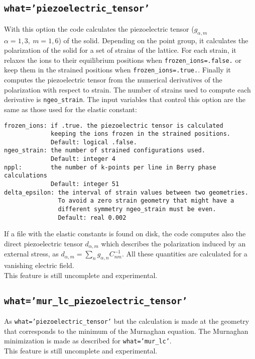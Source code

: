 \documentclass[12pt,a4paper]{article}
\begin{document}
\subsection{\texttt{what='piezoelectric\_tensor'}}
With this option the code calculates the piezoelectric tensor 
($g_{\alpha,m}$ $\alpha=1,3,\ m=1,6$) of the solid.
Depending on the point group, it calculates the polarization of the
solid for a set of strains of the lattice. For each strain, it relaxes 
the ions to their equilibrium positions when \texttt{frozen\_ions=.false.} 
or keep them in the strained positions when \texttt{frozen\_ions=.true.}. 
Finally it computes the piezoelectric tensor from the numerical derivatives 
of the polarization with respect to strain.
The number of strains used to compute each derivative is \texttt{ngeo\_strain}. The input variables
that control this option are the same as those used for the elastic constant:
\begin{verbatim}
frozen_ions: if .true. the piezoelectric tensor is calculated 
             keeping the ions frozen in the strained positions. 
             Default: logical .false.
ngeo_strain: the number of strained configurations used. 
             Default: integer 4
nppl:        the number of k-points per line in Berry phase calculations
             Default: integer 51
delta_epsilon: the interval of strain values between two geometries.
               To avoid a zero strain geometry that might have a
               different symmetry ngeo_strain must be even.
               Default: real 0.002
\end{verbatim}
If a file with the elastic constants is found on disk, the code computes also
the direct piezoelectric tensor $d_{\alpha,m}$ which describes
the polarization induced by an external stress, as $d_{\alpha,m}=
\sum_n g_{\alpha,n} C_{nm}^{-1}$. All these quantities are calculated 
for a vanishing electric field. \\
This feature is still uncomplete and experimental.

\subsection{\texttt{what='mur\_lc\_piezoelectric\_tensor'}}
As \texttt{what='piezoelectric\_tensor'} but the calculation is made at the
geometry that corresponds to the minimum of the Murnaghan equation. The
Murnaghan minimization is made as described for \texttt{what='mur\_lc'}. \\
This feature is still uncomplete and experimental.
\end{document}
